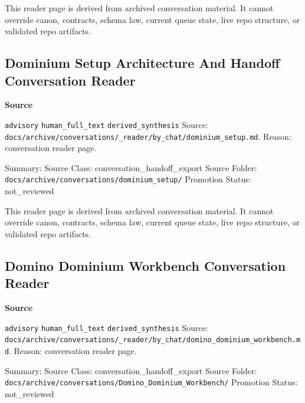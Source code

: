 \documentclass[9pt,a4paper,openany]{book}
\newcommand{\vonecallout}[3]{\par\medskip\noindent\begingroup\setlength{\fboxsep}{7pt}\colorbox{DomCalloutBg}{\parbox{0.94\linewidth}{\textbf{\textcolor{#1}{#2}}\par #3}}\endgroup\par\medskip}
\begin{document}
This reader page is derived from archived conversation material.\allowbreak{} It cannot override canon, contracts, schema law, current queue state, live repo structure, or validated repo artifacts.\allowbreak{}



\subsection{Dominium Setup Architecture And Handoff Conversation Reader}

\vonecallout{DomSlate}{Source}{\texttt{advisory} \texttt{human\_\allowbreak{}full\_\allowbreak{}text} \texttt{derived\_\allowbreak{}synthesis} Source: \texttt{docs/\allowbreak{}archive/\allowbreak{}conversations/\allowbreak{}\_\allowbreak{}reader/\allowbreak{}by\_\allowbreak{}chat/\allowbreak{}dominium\_\allowbreak{}setup.\allowbreak{}md}.\allowbreak{} Reason: conversation reader page.\allowbreak{}}

Summary: Source Class: conversation\_\allowbreak{}handoff\_\allowbreak{}export Source Folder: \texttt{docs/\allowbreak{}archive/\allowbreak{}conversations/\allowbreak{}dominium\_\allowbreak{}setup/\allowbreak{}} Promotion Status: not\_\allowbreak{}reviewed


This reader page is derived from archived conversation material.\allowbreak{} It cannot override canon, contracts, schema law, current queue state, live repo structure, or validated repo artifacts.\allowbreak{}



\subsection{Domino Dominium Workbench Conversation Reader}

\vonecallout{DomSlate}{Source}{\texttt{advisory} \texttt{human\_\allowbreak{}full\_\allowbreak{}text} \texttt{derived\_\allowbreak{}synthesis} Source: \texttt{docs/\allowbreak{}archive/\allowbreak{}conversations/\allowbreak{}\_\allowbreak{}reader/\allowbreak{}by\_\allowbreak{}chat/\allowbreak{}domino\_\allowbreak{}dominium\_\allowbreak{}workbench.\allowbreak{}md}.\allowbreak{} Reason: conversation reader page.\allowbreak{}}

Summary: Source Class: conversation\_\allowbreak{}handoff\_\allowbreak{}export Source Folder: \texttt{docs/\allowbreak{}archive/\allowbreak{}conversations/\allowbreak{}Domino\_\allowbreak{}Dominium\_\allowbreak{}Workbench/\allowbreak{}} Promotion Status: not\_\allowbreak{}reviewed
\end{document}
